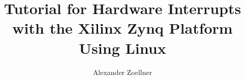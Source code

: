 \documentclass[12pt,a4paper]{article}
\author{Alexander Zoellner}
\title{Tutorial for Hardware Interrupts with the Xilinx Zynq Platform Using Linux}
\begin{document}
\maketitle
\begin{figure}[b]
    \centering
    \doclicenseThis
\end{figure}


\newpage




\end{document}
